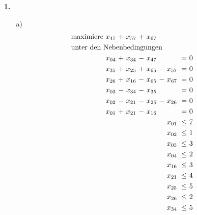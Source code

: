 \documentclass [a4paper,11pt]{article}
\author{\authorinfotitle}
\title{\titleinfo}
\date{\today}
\begin{document}
\maketitle
    \begin{enumerate}
        \item[\textbf{1.}]
        \begin{enumerate}
            \item[a)]
                \begin{align*}
                \begin{alignedat}{6}
                & \text{maximiere } & x_{47} &\ + &\ x_{57} &\ + &\ x_{67} & & & & \\
                & \rlap{unter den Nebenbedingungen} & & & & & & & & & \\
                && x_{04} &\ + &\ x_{34} &\ - &\ x_{47} &    &         &\ = &\ 0 \\
                && x_{35} &\ + &\ x_{25} &\ + &\ x_{65} &\ - &\ x_{57} &\ = &\ 0 \\
                && x_{26} &\ + &\ x_{16} &\ - &\ x_{65} &\ - &\ x_{67} &\ = &\ 0 \\
                && x_{03} &\ - &\ x_{34} &\ - &\ x_{35} &    &         &\ = &\ 0 \\
                && x_{02} &\ - &\ x_{21} &\ - &\ x_{25} &\ - &\ x_{26} &\ = &\ 0 \\
                && x_{01} &\ + &\ x_{21} &\ - &\ x_{16} &    &         &\ = &\ 0 \\
                &&        &    &         &    &         &    &\ x_{01} &\ \leq &\ 7 \\
                &&        &    &         &    &         &    &\ x_{02} &\ \leq &\ 1 \\
                &&        &    &         &    &         &    &\ x_{03} &\ \leq &\ 3 \\
                &&        &    &         &    &         &    &\ x_{04} &\ \leq &\ 2 \\
                &&        &    &         &    &         &    &\ x_{16} &\ \leq &\ 3 \\
                &&        &    &         &    &         &    &\ x_{21} &\ \leq &\ 4 \\
                &&        &    &         &    &         &    &\ x_{25} &\ \leq &\ 5 \\
                &&        &    &         &    &         &    &\ x_{26} &\ \leq &\ 2 \\
                &&        &    &         &    &         &    &\ x_{34} &\ \leq &\ 5 \\

\end{alignedat}
\end{align*}
\end{enumerate}
\end{enumerate}
\end{document}

